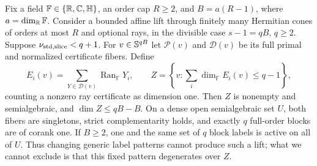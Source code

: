 \begin{proposition}
\label{prop:range-collapse}
Fix a field $\mathbb F\in\{\mathbb R,\mathbb C,\mathbb H\}$, an order cap $R\geq2$,
and $B=a(R-1)$, where $a=\dim_{\mathbb R}\mathbb F$. Consider a bounded
affine lift through finitely many Hermitian cones of orders at most $R$
and optional rays, in the divisible case $s-1=qB$, $q\geq2$.
Suppose $\nu_{\mathrm{std},\mathrm{slice}}<q+1$. For $v\in\mathbb S^{qB}$ let
$\mathcal P(v)$ and $\mathcal D(v)$ be its full primal and normalized
certificate fibers. Define
\[
 E_i(v)=\sum_{Y\in\mathcal D(v)}\operatorname{Ran}_{\mathbb F}Y_i,
 \qquad Z=\left\{v:\sum_i\dim_{\mathbb F}E_i(v)\leq q-1\right\},
\]
counting a nonzero ray certificate as dimension one. Then $Z$ is nonempty
and semialgebraic, and $\dim Z\leq qB-B$. On a dense open semialgebraic
set $U$, both fibers are singletons, strict complementarity holds, and
exactly $q$ full-order blocks are of corank one.
If $B\geq2$, one and the same set of $q$ block labels is active on all
of $U$. Thus changing generic label patterns cannot produce such a lift;
what we cannot exclude is that this fixed pattern degenerates over $Z$.
\end{proposition}
